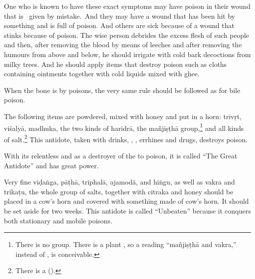 \begin{translation}
\item[58.1--60]

\begin{sloka}
    
    One who is known to have these exact symptoms may have poison
    in their wound  that is \dag\ given by mistake.\dag\ And they may have 
    a wound that  has been hit by something
     and is full of poison. And others
    are sick because of a wound that stinks because of poison.  
    The wise person debrides the excess flesh of such people and then, after
    removing the blood by means of leeches and after removing the
    humours from above and below, he should irrigate with cold bark
    decoctions from milky trees.   And he should apply items that destroy poison 
    such as cloths containing 
    ointments together with cold liquids mixed with ghee.
        
\end{sloka}
    
\item[61ab]    

\begin{sloka}
    When the bone is  by poisons, the very same rule should be 
    followed as for bile poison.

\item[61cd--63ab] 

The following items are powdered, mixed with honey and put in a horn:
%
\gls{trivṛt}, \gls{viśalyā}, \gls{madhuka}, the two kinds of
\gls{haridrā}, the \gls{mañjiṣṭhā} group,\footnote{There is no
     group. There is a plant , so a reading
     “\gls{mañjiṣṭhā} and \gls{vakra},” instead of
    , is conceivable.} and all kinds of
    salt.\footnote{There is a 
        ().}   This antidote, taken with drinks,
        , , errhines and drugs,
        destroys poison.

With its relentless  and as a destroyer of the
 to poison, it is called “The Great Antidote”
and has great power.
\end{sloka} 

\item[63cd--65ab]

\begin{sloka}
Very fine \gls{viḍaṅga}, \gls{pāṭhā}, \gls{triphalā}, \gls{ajamodā}, and
\gls{hiṅgu}, as well as \gls{vakra} and \gls{trikaṭu}, the whole group of salts,
together with \gls{citraka} and honey should be placed in a cow's horn and 
covered with something made of cow's horn.  It should be set aside for two 
weeks.
%
This antidote is called “Unbeaten” because it conquers  both stationary and 
mobile poisons. 
\end{sloka}


\end{translation}
